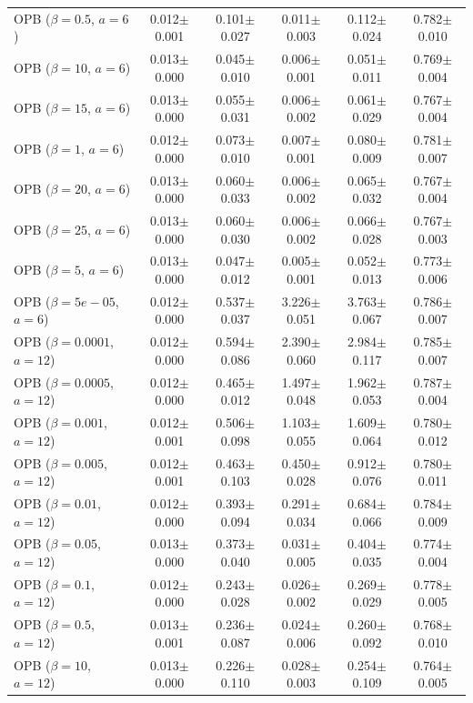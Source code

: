 \begin{table}[t]
{\begin{tabular}{l c c c c c}
OPB ($\beta=0.5$, $a=6$) & 0.012$\pm$0.001 & 0.101$\pm$0.027 & 0.011$\pm$0.003 & 0.112$\pm$0.024 & 0.782$\pm$0.010 \\
OPB ($\beta=10$, $a=6$) & 0.013$\pm$0.000 & 0.045$\pm$0.010 & 0.006$\pm$0.001 & 0.051$\pm$0.011 & 0.769$\pm$0.004 \\
OPB ($\beta=15$, $a=6$) & 0.013$\pm$0.000 & 0.055$\pm$0.031 & 0.006$\pm$0.002 & 0.061$\pm$0.029 & 0.767$\pm$0.004 \\
OPB ($\beta=1$, $a=6$) & 0.012$\pm$0.000 & 0.073$\pm$0.010 & 0.007$\pm$0.001 & 0.080$\pm$0.009 & 0.781$\pm$0.007 \\
OPB ($\beta=20$, $a=6$) & 0.013$\pm$0.000 & 0.060$\pm$0.033 & 0.006$\pm$0.002 & 0.065$\pm$0.032 & 0.767$\pm$0.004 \\
OPB ($\beta=25$, $a=6$) & 0.013$\pm$0.000 & 0.060$\pm$0.030 & 0.006$\pm$0.002 & 0.066$\pm$0.028 & 0.767$\pm$0.003 \\
OPB ($\beta=5$, $a=6$) & 0.013$\pm$0.000 & 0.047$\pm$0.012 & 0.005$\pm$0.001 & 0.052$\pm$0.013 & 0.773$\pm$0.006 \\
OPB ($\beta=5e-05$, $a=6$) & 0.012$\pm$0.000 & 0.537$\pm$0.037 & 3.226$\pm$0.051 & 3.763$\pm$0.067 & 0.786$\pm$0.007 \\
OPB ($\beta=0.0001$, $a=12$) & 0.012$\pm$0.000 & 0.594$\pm$0.086 & 2.390$\pm$0.060 & 2.984$\pm$0.117 & 0.785$\pm$0.007 \\
OPB ($\beta=0.0005$, $a=12$) & 0.012$\pm$0.000 & 0.465$\pm$0.012 & 1.497$\pm$0.048 & 1.962$\pm$0.053 & 0.787$\pm$0.004 \\
OPB ($\beta=0.001$, $a=12$) & 0.012$\pm$0.001 & 0.506$\pm$0.098 & 1.103$\pm$0.055 & 1.609$\pm$0.064 & 0.780$\pm$0.012 \\
OPB ($\beta=0.005$, $a=12$) & 0.012$\pm$0.001 & 0.463$\pm$0.103 & 0.450$\pm$0.028 & 0.912$\pm$0.076 & 0.780$\pm$0.011 \\
OPB ($\beta=0.01$, $a=12$) & 0.012$\pm$0.000 & 0.393$\pm$0.094 & 0.291$\pm$0.034 & 0.684$\pm$0.066 & 0.784$\pm$0.009 \\
OPB ($\beta=0.05$, $a=12$) & 0.013$\pm$0.000 & 0.373$\pm$0.040 & 0.031$\pm$0.005 & 0.404$\pm$0.035 & 0.774$\pm$0.004 \\
OPB ($\beta=0.1$, $a=12$) & 0.012$\pm$0.000 & 0.243$\pm$0.028 & 0.026$\pm$0.002 & 0.269$\pm$0.029 & 0.778$\pm$0.005 \\
OPB ($\beta=0.5$, $a=12$) & 0.013$\pm$0.001 & 0.236$\pm$0.087 & 0.024$\pm$0.006 & 0.260$\pm$0.092 & 0.768$\pm$0.010 \\
OPB ($\beta=10$, $a=12$) & 0.013$\pm$0.000 & 0.226$\pm$0.110 & 0.028$\pm$0.003 & 0.254$\pm$0.109 & 0.764$\pm$0.005 \\

\end{tabular}}
\end{table}
